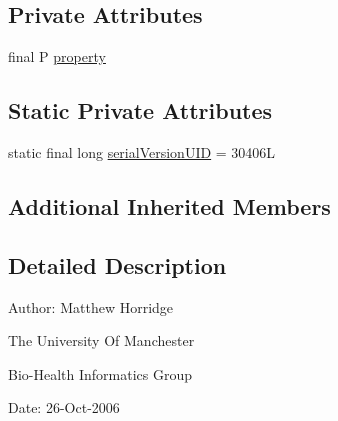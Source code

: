 \subsection*{Private Attributes}
\begin{DoxyCompactItemize}
\item 
final P \hyperlink{classuk_1_1ac_1_1manchester_1_1cs_1_1owl_1_1owlapi_1_1_o_w_l_restriction_impl_3_01_r_01extends_07a3269898cc55de4409f398a643a25a6_a62a04c57a027c2dda62b2eba4b4ed614}{property}
\end{DoxyCompactItemize}
\subsection*{Static Private Attributes}
\begin{DoxyCompactItemize}
\item 
static final long \hyperlink{classuk_1_1ac_1_1manchester_1_1cs_1_1owl_1_1owlapi_1_1_o_w_l_restriction_impl_3_01_r_01extends_07a3269898cc55de4409f398a643a25a6_a618dfd2d18c223410db093a97002befd}{serial\-Version\-U\-I\-D} = 30406\-L
\end{DoxyCompactItemize}
\subsection*{Additional Inherited Members}


\subsection{Detailed Description}
Author\-: Matthew Horridge\par
 The University Of Manchester\par
 Bio-\/\-Health Informatics Group\par
 Date\-: 26-\/\-Oct-\/2006\par
\par
 

